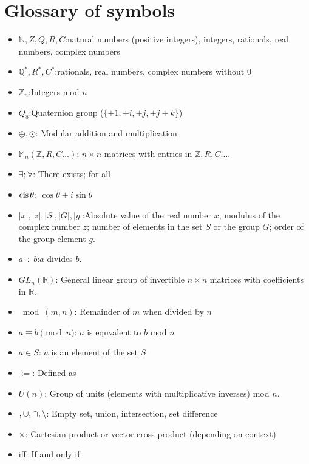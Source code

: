 \chapter*{Glossary of symbols}

\begin{itemize}
\item[]
${\mathbb N, Z,Q,R,C}$:\quad natural numbers (positive integers), integers, rationals, real numbers, complex numbers
\item[]
${\mathbb Q^{\ast},R^{\ast},C^{\ast}}$:\quad  rationals, real numbers, complex numbers without $0$
\item[]
${\mathbb Z}_n$:\quad Integers mod $n$
\item[]
$Q_8$:\quad Quaternion group ($ \{ \pm 1, \pm i, \pm j, \pm j  \pm k \}$)
\item[]
$\oplus, \odot$: \quad Modular addition and multiplication
\item[]
${\mathbb M}_n({\mathbb Z,R,C}\ldots)$: \quad $n \times n$ matrices with entries in ${\mathbb Z,R,C}\ldots$. 
\item[]
$\exists; \forall$: \quad There exists; for all
\item[]
$\operatorname{cis} \theta$: \quad $\cos \theta + i \sin \theta$
\item[]
$|x|,|z|,|S|,|G|,|g|$:\quad Absolute value of the real number $x$; modulus of the complex number $z$; number of elements in the set $S$ or the group $G$; order of the group element $g$. 
\item[]
$a \div b$:\quad $a$ divides $b$.
\item[]
$GL_n({\mathbb R})$: \quad General linear group of invertible $n \times n$ matrices with coefficients in ${\mathbb R}$.
\item[]
 $\bmod(m,n)$: \quad Remainder of $m$ when divided by $n$
\item[]
$a \equiv b \pmod n $: \quad $a$ is equvalent to $b$ mod $n$
\item[]
$a \in S$: \quad $a$ is an element of the set $S$
\item[]
$:=$: \quad Defined as
\item[]
$U(n)$: \quad Group of units (elements with multiplicative inverses) mod $n$.
\item[]
$\empty, \cup, \cap, \setminus$: \quad Empty set, union, intersection, set difference
\item[]
$\times$: \quad Cartesian product or vector cross product (depending on context)
\item[]
iff: \quad If and only if

\end{itemize}
